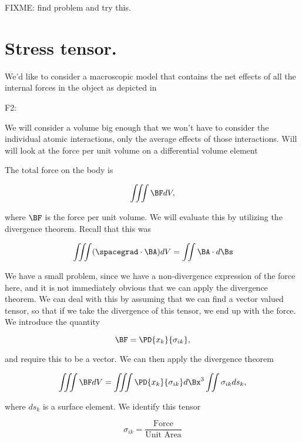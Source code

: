 FIXME: find problem and try this.

\section{Stress tensor.}

We'd like to consider a macroscopic model that contains the net effects of all the internal forces in the object as depicted in

F2: 

We will consider a volume big enough that we won't have to consider the individual atomic interactions, only the average effects of those interactions.  Will will look at the force per unit volume on a differential volume element

The total force on the body is 

\begin{equation}\label{eqn:continuumL3:230}
\iiint \BF dV,
\end{equation}

where $\BF$ is the force per unit volume.  We will evaluate this by utilizing the divergence theorem.  Recall that this was

\begin{equation}\label{eqn:continuumL3:250}
\iiint (\spacegrad \cdot \BA) dV
= \iint \BA \cdot d\Bs
\end{equation}

We have a small problem, since we have a non-divergence expression of the force here, and it is not immediately obvious that we can apply the divergence theorem.  We can deal with this by assuming that we can find a vector valued tensor, so that if we take the divergence of this tensor, we end up with the force.  We introduce the quantity

\begin{equation}\label{eqn:continuumL3:270}
\BF = \PD{x_k}{\sigma_{ik}},
\end{equation}

and require this to be a vector.  We can then apply the divergence theorem

\begin{equation}\label{eqn:continuumL3:290}
\iiint \BF dV 
= \iiint \PD{x_k}{\sigma_{ik}} d\Bx^3 
\iint \sigma_{ik} ds_k,
\end{equation}

where $ds_k$ is a surface element.  We identify this tensor

\begin{equation}\label{eqn:continuumL3:310}
\sigma_{ik} = \frac{\text{Force}}{\text{Unit Area}}
\end{equation}

